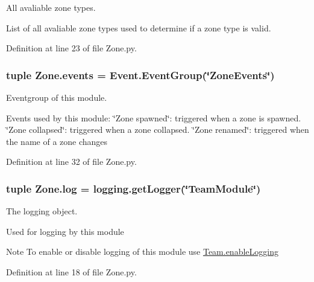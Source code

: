 All avaliable zone types. 

List of all avaliable zone types used to determine if a zone type is valid. 

Definition at line 23 of file Zone.py.

\hypertarget{namespace_zone_a2cf3edd088ca6482872ba018b81ef52a}{
\subsubsection[{events}]{\setlength{\rightskip}{0pt plus 5cm}tuple {\bf Zone.events} = {\bf Event.EventGroup}(\char`\"{}ZoneEvents\char`\"{})}}
\label{namespace_zone_a2cf3edd088ca6482872ba018b81ef52a}


Eventgroup of this module. 

Events used by this module: \char`\"{}Zone spawned\char`\"{}: triggered when a zone is spawned. \char`\"{}Zone collapsed\char`\"{}: triggered when a zone collapsed. \char`\"{}Zone renamed\char`\"{}: triggered when the name of a zone changes 

Definition at line 32 of file Zone.py.

\hypertarget{namespace_zone_aad90704d2c88929bd92b7acf2b9a09d6}{
\subsubsection[{log}]{\setlength{\rightskip}{0pt plus 5cm}tuple {\bf Zone.log} = logging.getLogger(\char`\"{}TeamModule\char`\"{})}}
\label{namespace_zone_aad90704d2c88929bd92b7acf2b9a09d6}


The logging object. 

Used for logging by this module \begin{DoxyNote}{Note}
To enable or disable logging of this module use \hyperlink{namespace_team_a391de1d02502546ec5d88de1632b3bc2}{Team.enableLogging} 
\end{DoxyNote}


Definition at line 18 of file Zone.py.

